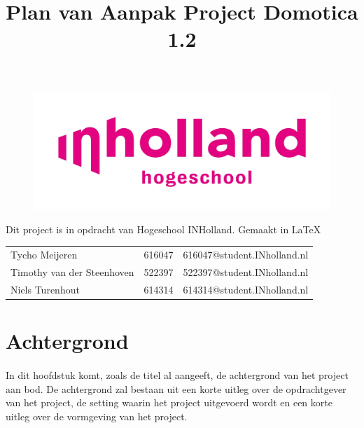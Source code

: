 \documentclass[11pt]{article}
\title{Plan van Aanpak Project Domotica 1.2}
\date{} %
\begin{document}
\thispagestyle{empty}
\maketitle %

\begin{figure}[h]
	\centering
	\includegraphics[width=\textwidth]{inholland}
\end{figure}

\vspace{20mm} %

\center Dit project is in opdracht van Hogeschool INHolland. \center Gemaakt in \LaTeX 

	\vspace{10mm}

\begin{tabular} {l c c} %
	
	Tycho Meijeren & 616047& 616047@student.INholland.nl\\
	
	Timothy van der Steenhoven & 522397 & 522397@student.INholland.nl\\
	
	Niels Turenhout & 614314 & 614314@student.INholland.nl
\end{tabular}


\newpage

\tableofcontents
\thispagestyle{empty}

\newpage
\section{Achtergrond}

\paragraph{}
\begin{flushleft}
	In dit hoofdstuk komt, zoals de titel al aangeeft, de achtergrond van het project aan bod.
	De achtergrond zal bestaan uit een korte uitleg over de opdrachtgever van het project, de 
	setting waarin het project uitgevoerd wordt en een korte uitleg over de vormgeving van het project.
\end{flushleft}
\end{document}
